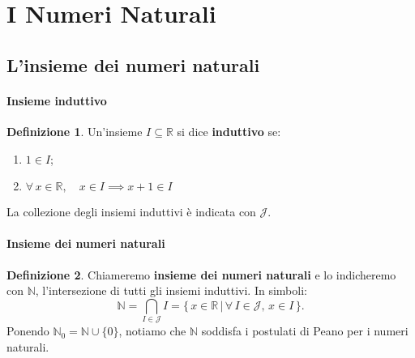 \documentclass{article}
\theoremstyle{plain}
\theoremstyle{definition}
\newtheorem{defn}{Definizione}[section]
\theoremstyle{remark}
\begin{document}
\vspace{50pt} 
\section{I Numeri Naturali}
\vspace{50pt}

\subsection{L'insieme dei numeri naturali}

\vspace{10pt}

\paragraph{Insieme induttivo}

\begin{bxthm}
\begin{defn}
    Un'insieme $I\subseteq\mathbb{R}$ si dice \textbf{induttivo} se:
    \begin{enumerate}
        \item $1\in I$;
        \item $\forall\, x\in\mathbb{R},\quad x\in I\implies x+1\in I$
    \end{enumerate}
    La collezione degli insiemi induttivi è indicata con $\mathcal{J}$.
\end{defn}
\end{bxthm}

\vspace{10pt}

\paragraph{Insieme dei numeri naturali}
\begin{bxthm}
\begin{defn}
    Chiameremo \textbf{insieme dei numeri naturali} e lo indicheremo con $\mathbb{N}$, l'intersezione di tutti gli insiemi induttivi. In simboli:
    \[
        \mathbb{N} = \bigcap_{I\in \mathcal{J}} I = \{\,x\in\mathbb{R}\,|\,\forall\, I\in \mathcal{J},\, x\in I\,\}.
    \]
    Ponendo $\mathbb{N}_0=\mathbb{N}\cup\{0\}$, notiamo che $\mathbb{N}$ soddisfa i postulati di Peano per i numeri naturali.
\end{defn}
\end{bxthm}

\vspace{10pt}
\end{document}
